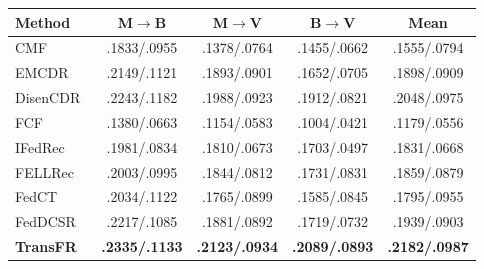 \clearpage
{}

\par\noindent\begin{minipage}{\columnwidth}\centering\small
{}
\label{tab:transfr-published}
\setlength{\tabcolsep}{2.5pt}
\begin{tabular}{@{}lcccc@{}}
\toprule
Method & M$\to$B & M$\to$V & B$\to$V & Mean \\
\midrule
CMF~\citep{singh2008relational} & .1833/.0955 & .1378/.0764 & .1455/.0662 & .1555/.0794 \\
EMCDR~\citep{man2017cross} & .2149/.1121 & .1893/.0901 & .1652/.0705 & .1898/.0909 \\
DisenCDR~\citep{cao2022disencdr} & .2243/.1182 & .1988/.0923 & .1912/.0821 & .2048/.0975 \\
FCF~\citep{ammad2019federated} & .1380/.0663 & .1154/.0583 & .1004/.0421 & .1179/.0556 \\
IFedRec~\citep{zhang2024ifedrec} & .1981/.0834 & .1810/.0673 & .1703/.0497 & .1831/.0668 \\
FELLRec~\citep{zhao2025fellrec} & .2003/.0995 & .1844/.0812 & .1731/.0831 & .1859/.0879 \\
FedCT~\citep{liu2021fedct} & .2034/.1122 & .1765/.0899 & .1585/.0845 & .1795/.0955 \\
FedDCSR~\citep{zhang2024feddcsr} & .2217/.1085 & .1881/.0892 & .1719/.0732 & .1939/.0903 \\
\textbf{TransFR}~\citep{zhang2026transfr} & \textbf{.2335/.1133} & \textbf{.2123/.0934} & \textbf{.2089/.0893} & \textbf{.2182/.0987} \\
\bottomrule
\end{tabular}

\end{minipage}\par\addvspace{8pt}


